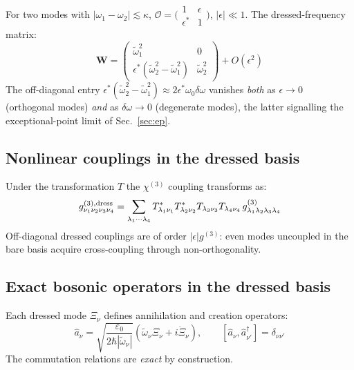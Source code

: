 \documentclass[12pt]{article}
\newcommand{\dress}{{\rm dress}}
\newcommand{\tomega}{\tilde{\omega}}
\begin{document}
For two modes with $|\omega_1-\omega_2|\lesssim\kappa$,
$\mathcal{O} = \bigl(\begin{smallmatrix}1&\epsilon\\\epsilon^*&1
\end{smallmatrix}\bigr)$, $|\epsilon|\ll 1$.  The dressed-frequency
matrix:
\begin{equation}
  \mathbf{W} = \begin{pmatrix}
  \tomega_1^2 & 0\\
  \epsilon^*(\tomega_2^2-\tomega_1^2) & \tomega_2^2
  \end{pmatrix}+O(\epsilon^2)
  \label{eq:W_twomodes}
\end{equation}
The off-diagonal entry $\epsilon^*(\tomega_2^2-\tomega_1^2)
\approx 2\epsilon^*\omega_0\delta\omega$ vanishes \emph{both} as
$\epsilon\to 0$ (orthogonal modes) \emph{and} as $\delta\omega\to 0$
(degenerate modes), the latter signalling the exceptional-point limit
of Sec.~\ref{sec:ep}.

\subsection{Nonlinear couplings in the dressed basis}

Under the transformation $T$ the $\chi^{(3)}$ coupling transforms as:
\begin{equation}
  g^{(3),\dress}_{\nu_1\nu_2\nu_3\nu_4} =
  \sum_{\lambda_1\cdots\lambda_4}
  T_{\lambda_1\nu_1}^*T_{\lambda_2\nu_2}^*T_{\lambda_3\nu_3}T_{\lambda_4\nu_4}
  \,g^{(3)}_{\lambda_1\lambda_2\lambda_3\lambda_4}
  \label{eq:g3_dressed}
\end{equation}
Off-diagonal dressed couplings are of order $|\epsilon|g^{(3)}$: even modes
uncoupled in the bare basis acquire cross-coupling through non-orthogonality.

\subsection{Exact bosonic operators in the dressed basis}

Each dressed mode $\Xi_\nu$ defines annihilation and creation operators:
\begin{equation}
  \hat{a}_\nu = \sqrt{\frac{\varepsilon_0}{2\hbar|\tomega_\nu|}}
  \left(\tomega_\nu\Xi_\nu+i\dot{\Xi}_\nu\right),\qquad
  [\hat{a}_\nu,\hat{a}_{\nu'}^\dagger] = \delta_{\nu\nu'}
  \label{eq:dressed_ops}
\end{equation}
The commutation relations are \emph{exact} by construction.
\end{document}
